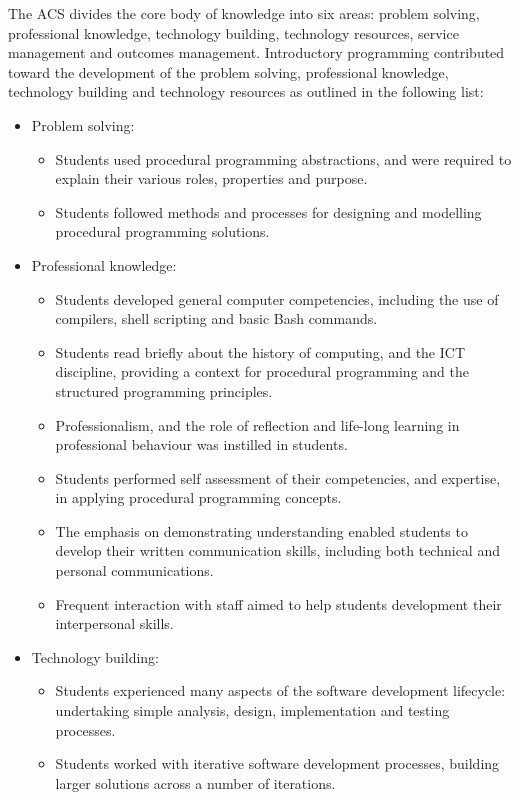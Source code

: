 The ACS divides the core body of knowledge into six areas: problem solving, professional knowledge, technology building, technology resources, service management and outcomes management. Introductory programming contributed toward the development of the problem solving, professional knowledge, technology building and technology resources as outlined in the following list:
\begin{itemize}[noitemsep,nolistsep]
	\item Problem solving:
	\begin{itemize}[noitemsep,nolistsep]
		\item Students used procedural programming abstractions, and were required to explain their various roles, properties and purpose. 
		\item Students followed methods and processes for designing and modelling procedural programming solutions.
	\end{itemize}
	\item Professional knowledge:
	\begin{itemize}[noitemsep,nolistsep]
		\item Students developed general computer competencies, including the use of compilers, shell scripting and basic Bash commands.
		\item Students read briefly about the history of computing, and the ICT discipline, providing a context for procedural programming and the structured programming principles.
		\item Professionalism, and the role of reflection and life-long learning in professional behaviour was instilled in students.
		\item Students performed self assessment of their competencies, and expertise, in applying procedural programming concepts. 
		\item The emphasis on demonstrating understanding enabled students to develop their written communication skills, including both technical and personal communications.
		\item Frequent interaction with staff aimed to help students development their interpersonal skills.
	\end{itemize}
	\item Technology building:
	\begin{itemize}[noitemsep,nolistsep]
		\item Students experienced many aspects of the software development lifecycle: undertaking simple analysis, design, implementation and testing processes.
		\item Students worked with iterative software development processes, building larger solutions across a number of iterations.

\end{itemize}
\end{itemize}
